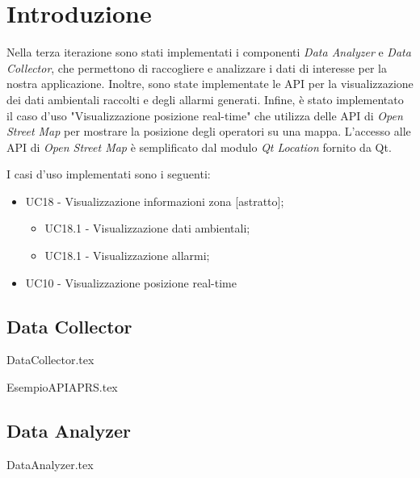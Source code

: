 \section{Introduzione}
Nella terza iterazione sono stati implementati i componenti \textit{Data Analyzer} e \textit{Data Collector}, che permettono di raccogliere e analizzare i dati di interesse per la nostra applicazione. Inoltre, sono state implementate le API per la visualizzazione dei dati ambientali raccolti e degli allarmi generati. Infine, è stato implementato il caso d'uso "Visualizzazione posizione real-time" che utilizza delle API di \textit{Open Street Map} per mostrare la posizione degli operatori su una mappa. L'accesso alle API di \textit{Open Street Map} è semplificato dal modulo \textit{Qt Location} fornito da Qt. 

I casi d'uso implementati sono i seguenti:
\begin{itemize}
	\item UC18 - Visualizzazione informazioni zona [astratto];
	\begin{itemize}
		\item UC18.1 - Visualizzazione dati ambientali;
		\item UC18.1 - Visualizzazione allarmi;
	\end{itemize}
	\item UC10 - Visualizzazione posizione real-time
\end{itemize}

\clearpage

\subsection{Data Collector}
{DataCollector.tex}

\clearpage

{EsempioAPIAPRS.tex}

\clearpage

\subsection{Data Analyzer}
{DataAnalyzer.tex}

\clearpage

